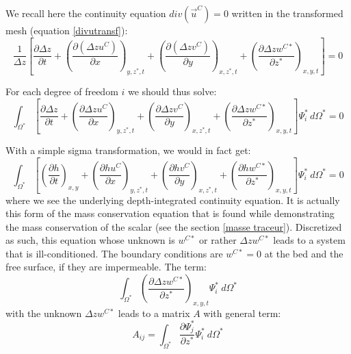 We recall here the continuity equation $div(\vec{u}^C)=0$ written in
the transformed mesh (equation \ref{divutransf}):
\begin{equation}
\dfrac{1}{\Delta z}\left[  \dfrac{\partial\Delta z}{\partial t}+\left(
\dfrac{\partial\left(  \Delta zu^C\right)  }{\partial x}\right)  _{y,z^{\ast}%
,t}+\left(  \dfrac{\partial\left(  \Delta zv^C\right)  }{\partial y}\right)
_{x,z^{\ast},t}+\left(  \dfrac{\partial\Delta zw^{C\ast}}{\partial z^{\ast}%
}\right)  _{x,y,t}\right]=0 \label{continuiteparplan}
\end{equation}

For each degree of freedom $i$ we should thus solve:
\begin{equation}
\int_{\Omega^{\ast}}\left[  \dfrac{\partial\Delta z}{\partial t}+\left(
\dfrac{\partial\Delta zu^C}{\partial x}\right)  _{y,z^{\ast},t}+\left(
\dfrac{\partial\Delta zv^C}{\partial y}\right)  _{x,z^{\ast},t}+\left(
\dfrac{\partial\Delta zw^{C\ast}}{\partial z^{\ast}}\right)  _{x,y,t}\right]
\Psi_{i}^{\ast}\,d\Omega^{\ast}=0
\end{equation}

With a simple sigma transformation, we would in fact get:
\begin{equation}
\int_{\Omega^{\ast}}\left[\left(\dfrac{\partial h}{\partial t}\right)
_{x,y}+\left(\dfrac{\partial hu^C}{\partial x}\right)_{y,z^{\ast},t}+\left(
\dfrac{\partial hv^C}{\partial y}\right)_{x,z^{\ast},t}+\left(  \dfrac{\partial
hw^{C\ast}}{\partial z^{\ast}}\right)_{x,y,t}\right]  \Psi_{i}^{\ast
}~d\Omega^{\ast}=0
\end{equation}
where we see the underlying depth-integrated continuity equation.
It is actually this form of the mass conservation equation that is found while
demonstrating the mass conservation of the scalar (see the section
\ref{masse traceur}). Discretized as such, this equation whose unknown is
$w^{C\ast}$ or rather $\Delta zw^{C\ast}$ leads to a system that is
ill-conditioned. The boundary conditions are
$w^{C\ast}=0$ at the bed and the free surface, if they are impermeable. The term:%
\begin{equation}
\int_{\Omega^{\ast}}\left(  \dfrac{\partial\Delta zw^{C\ast}}{\partial z^{\ast}}\right)_{x,y,t}
\Psi_{i}^{\ast}~d\Omega^{\ast}%
\end{equation}
with the unknown $\Delta zw^{C\ast}$ leads to a matrix $A$ with general term:%
\begin{equation}
A_{ij}=\int_{\Omega^{\ast}}\dfrac{\partial\Psi_{j}^{\ast}}{\partial z^{\ast}%
}\Psi_{i}^{\ast}~d\Omega^{\ast}%
\end{equation}

